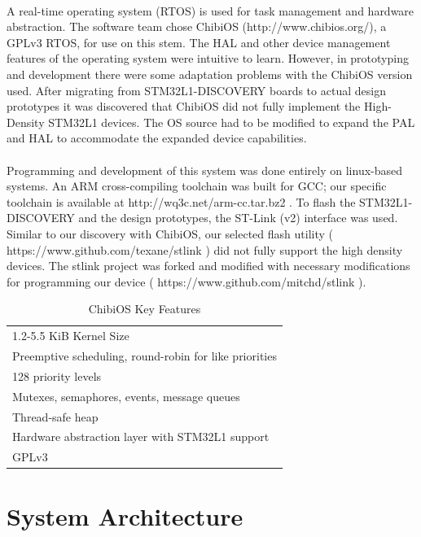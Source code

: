 \documentclass[10pt]{article}
\begin{document}
\paragraph*{}A real-time operating system (RTOS) is used for task management and hardware abstraction.  The software team chose ChibiOS (http://www.chibios.org/), a GPLv3 RTOS, for use on this stem.  The HAL and other device management features of the operating system were intuitive to learn.  However, in prototyping and development there were some adaptation problems with the ChibiOS version used.  After migrating from STM32L1-DISCOVERY boards to actual design prototypes it was discovered that ChibiOS did not fully implement the High-Density STM32L1 devices.  The OS source had to be modified to expand the PAL and HAL to accommodate the expanded device capabilities.

\paragraph*{}Programming and development of this system was done entirely on linux-based systems.  An ARM cross-compiling toolchain was built for GCC; our specific toolchain is available at http://wq3c.net/arm-cc.tar.bz2 .  To flash the STM32L1-DISCOVERY and the design prototypes, the ST-Link (v2) interface was used.  Similar to our discovery with ChibiOS, our selected flash utility ( https://www.github.com/texane/stlink ) did not fully support the high density devices.  The stlink project was forked and modified with necessary modifications for programming our device ( https://www.github.com/mitchd/stlink ).

\begin{table}
	\centering
	\caption{ChibiOS Key Features}
	\begin{tabular}{l}
		\hline
		\hline
		1.2-5.5 KiB Kernel Size \\
		Preemptive scheduling, round-robin for like priorities \\
		128 priority levels \\
		Mutexes, semaphores, events, message queues \\
		Thread-safe heap \\
		Hardware abstraction layer with STM32L1 support \\
		GPLv3 \\
	\end{tabular}
\end{table}
	
\section*{System Architecture}
\end{document}
